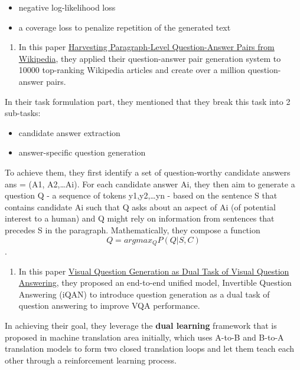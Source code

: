 \documentclass[]{book}
\providecommand{\tightlist}{%
  \setlength{\itemsep}{0pt}\setlength{\parskip}{0pt}}
\theoremstyle{definition}
\theoremstyle{definition}
\theoremstyle{definition}
\theoremstyle{remark}
\begin{document}
\begin{itemize}
\tightlist
\item
  negative log-likelihood loss
\item
  a coverage loss to penalize repetition of the generated text
\end{itemize}

\begin{enumerate}
\def\labelenumi{\arabic{enumi}.}
\setcounter{enumi}{1}
\tightlist
\item
  In this paper \href{https://arxiv.org/pdf/1805.05942.pdf}{Harvesting
  Paragraph-Level Question-Answer Pairs from Wikipedia}, they applied
  their question-answer pair generation system to 10000 top-ranking
  Wikipedia articles and create over a million question-answer pairs.
\end{enumerate}

In their task formulation part, they mentioned that they break this task
into 2 sub-tasks:

\begin{itemize}
\tightlist
\item
  candidate answer extraction
\item
  answer-specific question generation
\end{itemize}

To achieve them, they first identify a set of question-worthy candidate
answers ans = (A1, A2,\ldots{}Ai). For each candidate answer Ai, they
then aim to generate a question Q - a sequence of tokens
y1,y2,\ldots{}yn - based on the sentence S that contains candidate Ai
such that Q asks about an aspect of Ai (of potential interest to a
human) and Q might rely on information from sentences that precedes S in
the paragraph. Mathematically, they compose a function
\[Q = argmax_Q P(Q|S,C)\].

\begin{enumerate}
\def\labelenumi{\arabic{enumi}.}
\setcounter{enumi}{2}
\tightlist
\item
  In this paper
  \href{http://cvboy.com/pdf/publications/cvpr2018_iqan.pdf}{Visual
  Question Generation as Dual Task of Visual Question Answering}, they
  proposed an end-to-end unified model, Invertible Question Answering
  (iQAN) to introduce question generation as a dual task of question
  answering to improve VQA performance.
\end{enumerate}

In achieving their goal, they leverage the \textbf{dual learning}
framework that is proposed in machine translation area initially, which
uses A-to-B and B-to-A translation models to form two closed translation
loops and let them teach each other through a reinforcement learning
process.
\end{document}
